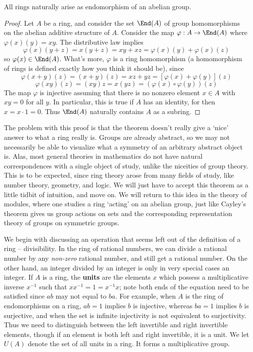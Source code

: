 \begin{theorem}
    All rings naturally arise as endomorphism of an abelian group.
\end{theorem}
\begin{proof}
    Let $A$ be a ring, and consider the set $\End(A)$ of group homomorphisms on the abelian additive structure of $A$. Consider the map $\varphi: A \to \End(A)$ where $\varphi(x)(y) = xy$. The distributive law implies
    \[ \varphi(x)(y + z) = x(y + z) = xy + xz = \varphi(x)(y) + \varphi(x)(z) \]
    so $\varphi(x) \in \End(A)$. What's more, $\varphi$ is a ring homomorphism (a homomorphism of rings is defined exactly how you think it should be), since
    \[ \varphi(x + y)(z) = (x + y)(z) = xz + yz = [\varphi(x) + \varphi(y)](z) \]
    \[ \varphi(xy)(z) = (xy)z = x(yz) = (\varphi(x) \circ \varphi(y))(z) \]
    The map $\varphi$ is injective assuming that there is no nonzero element $x \in A$ with $xy = 0$ for all $y$. In particular, this is true if $A$ has an identity, for then $x = x \cdot 1 = 0$. Thus $\End(A)$ naturally contains $A$ as a subring.
\end{proof}

The problem with this proof is that the theorem doesn't really give a `nice' answer to what a ring really is. Groups are already abstract, so we may not necessarily be able to visualize what a symmetry of an arbitrary abstract object is. Alas, most general theories in mathematics do not have natural correspondences with a single object of study, unlike the niceities of group theory. This is to be expected, since ring theory arose from many fields of study, like number theory, geometry, and logic. We will just have to accept this theorem as a little tidbit of intuition, and move on. We will return to this idea in the theory of modules, where one studies a ring `acting' on an abelian group, just like Cayley's theorem gives us group actions on sets and the corresponding representation theory of groups on symmetric groups.

We begin with discussing an operation that seems left out of the definition of a ring -- divisibility. In the ring of rational numbers, we can divide a rational number by any {\it non-zero} rational number, and still get a rational number. On the other hand, an integer divided by an integer is only in very special cases an integer. If $A$ is a ring, the {\bf units} are the elements $x$ which possess a multiplicative inverse $x^{-1}$ such that $xx^{-1} = 1 = x^{-1}x$; note both ends of the equation need to be satisfied since $ab$ may not equal to $ba$. For example, when $A$ is the ring of endomorphisms on a ring, $ab = 1$ implies $b$ is injective, whereas $ba = 1$ implies $b$ is surjective, and when the set is infinite injectivity is not equivalent to surjectivity. Thus we need to distinguish between the left invertible and right invertible elements, though if an element is both left and right invertible, it is a unit. We let $U(A)$ denote the set of all units in a ring. It forms a multiplicative group.

